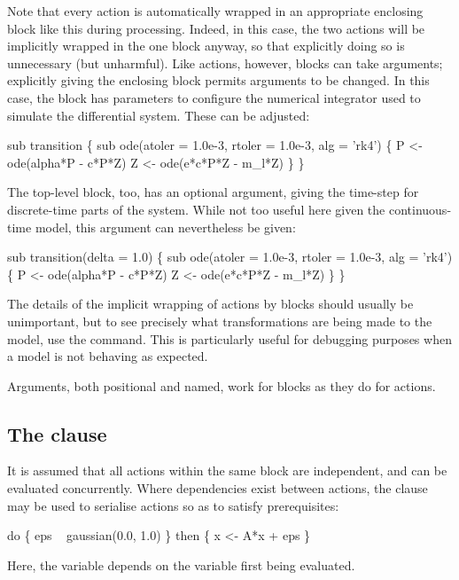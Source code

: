 Note that every action is automatically wrapped in an appropriate enclosing
block like this during processing. Indeed, in this case, the two
 actions will be implicitly wrapped in the one 
block anyway, so that explicitly doing so is unnecessary (but unharmful). Like
actions, however, blocks can take arguments; explicitly giving the enclosing
block permits arguments to be changed. In this case, the  block
has parameters to configure the numerical integrator used to simulate the
differential system. These can be adjusted:
\begin{bicode}
sub transition \{
  sub ode(atoler = 1.0e-3, rtoler = 1.0e-3, alg = 'rk4') \{
    P <- ode(alpha*P - c*P*Z)
    Z <- ode(e*c*P*Z - m_l*Z)
  \}
\}
\end{bicode}

The top-level  block, too, has an optional argument,
giving the time-step for discrete-time parts of the system. While not too
useful here given the continuous-time model, this argument can nevertheless be
given:
\begin{bicode}
sub transition(delta = 1.0) \{
  sub ode(atoler = 1.0e-3, rtoler = 1.0e-3, alg = 'rk4') \{
    P <- ode(alpha*P - c*P*Z)
    Z <- ode(e*c*P*Z - m_l*Z)
  \}
\}
\end{bicode}

\begin{tip}
The details of the implicit wrapping of actions by blocks should usually be
unimportant, but to see precisely what transformations are being made to the
model, use the  command. This is particularly useful for
debugging purposes when a model is not behaving as expected.
\end{tip}

Arguments, both positional and named, work for blocks as they do for actions.

\subsection{The  clause\label{do_then}}

It is assumed that all actions within the same block are independent, and can
be evaluated concurrently. Where dependencies exist between actions, the
 clause may be used to serialise actions so
as to satisfy prerequisites:
\begin{bicode}
do \{
  eps ~ gaussian(0.0, 1.0)
\} then \{
  x <- A*x + eps
\}
\end{bicode}
Here, the variable  depends on the variable  first being
evaluated.

